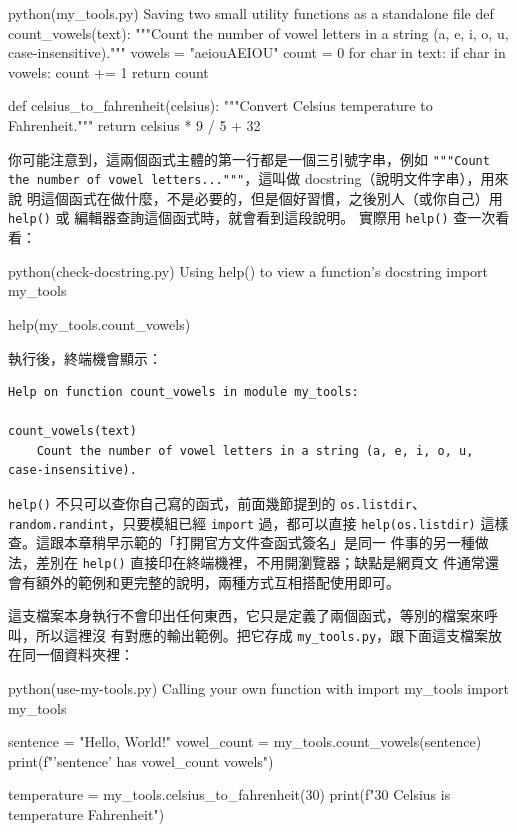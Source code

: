 \begin{example}{python}{(my\_tools.py) Saving two small utility functions as a standalone file}
def count_vowels(text):
    """Count the number of vowel letters in a string (a, e, i, o, u, case-insensitive)."""
    vowels = "aeiouAEIOU"
    count = 0
    for char in text:
        if char in vowels:
            count += 1
    return count


def celsius_to_fahrenheit(celsius):
    """Convert Celsius temperature to Fahrenheit."""
    return celsius * 9 / 5 + 32
\end{example}

你可能注意到，這兩個函式主體的第一行都是一個三引號字串，例如
\texttt{"""Count the number of vowel letters..."""}，這叫做 docstring（說明文件字串），用來說
明這個函式在做什麼，不是必要的，但是個好習慣，之後別人（或你自己）用 \texttt{help()} 或
編輯器查詢這個函式時，就會看到這段說明。
實際用 \texttt{help()} 查一次看看：

\begin{example}{python}{(check-docstring.py) Using help() to view a function's docstring}
import my_tools

help(my_tools.count_vowels)
\end{example}

執行後，終端機會顯示：

\begin{verbatim}
Help on function count_vowels in module my_tools:

count_vowels(text)
    Count the number of vowel letters in a string (a, e, i, o, u, case-insensitive).
\end{verbatim}

\texttt{help()} 不只可以查你自己寫的函式，前面幾節提到的 \texttt{os.listdir}、
\texttt{random.randint}，只要模組已經 \texttt{import} 過，都可以直接
\texttt{help(os.listdir)} 這樣查。這跟本章稍早示範的「打開官方文件查函式簽名」是同一
件事的另一種做法，差別在 \texttt{help()} 直接印在終端機裡，不用開瀏覽器；缺點是網頁文
件通常還會有額外的範例和更完整的說明，兩種方式互相搭配使用即可。

這支檔案本身執行不會印出任何東西，它只是定義了兩個函式，等別的檔案來呼叫，所以這裡沒
有對應的輸出範例。把它存成 \texttt{my\_tools.py}，跟下面這支檔案放在同一個資料夾裡：

\begin{example}{python}{(use-my-tools.py) Calling your own function with import my\_tools}
import my_tools

sentence = "Hello, World!"
vowel_count = my_tools.count_vowels(sentence)
print(f"'{sentence}' has {vowel_count} vowels")

temperature = my_tools.celsius_to_fahrenheit(30)
print(f"30 Celsius is {temperature} Fahrenheit")
\end{example}

